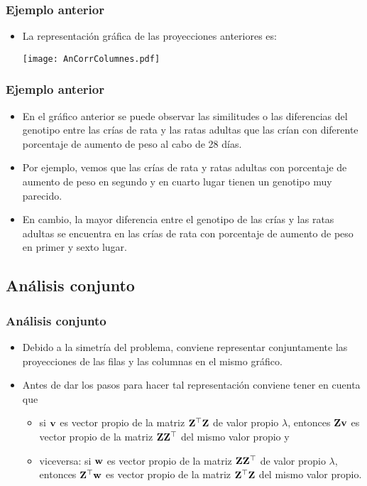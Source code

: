 \begin{frame}
\frametitle{Ejemplo anterior}
\begin{itemize}
\item<2->{La representación gráfica de las proyecciones anteriores es:
\begin{center}
\texttt{[image: AnCorrColumnes.pdf]}
\end{center}}
\end{itemize}
\end{frame}
\begin{frame}
\frametitle{Ejemplo anterior}
\begin{itemize}
\item<2->{En el gráfico anterior se puede observar las similitudes o las diferencias del genotipo entre las crías de rata y las ratas adultas que las crían con diferente porcentaje de aumento de peso al cabo de 28 días. }
\item<3->{Por ejemplo, vemos que las crías de rata y ratas adultas con porcentaje de aumento de peso en segundo y en cuarto lugar tienen un genotipo muy parecido.}
\item<4->{En cambio, la mayor diferencia entre el genotipo de las crías y las ratas adultas se encuentra en las crías de rata con porcentaje de aumento de peso en primer y sexto lugar.}
\end{itemize}
\end{frame}
\subsection{Análisis conjunto}
\begin{frame}
\frametitle{Análisis conjunto}
\begin{itemize}
\item<2->{Debido a la simetría del problema, conviene representar conjuntamente las proyecciones de las filas y las columnas en el mismo gráfico.}
\item<3->{Antes de dar los pasos para hacer tal representación conviene tener en cuenta que
\begin{itemize}
\item<4->{si $\mathbf{v}$ es vector propio de la matriz $\mathbf{Z}^\top\mathbf{Z}$ de valor propio $\lambda$, entonces $\mathbf{Z}\mathbf{v}$ es vector propio de la matriz $\mathbf{Z}\mathbf{Z}^\top$ del mismo valor propio y} \item<5->{viceversa: si $\mathbf{w}$ es vector propio de la matriz $\mathbf{Z}\mathbf{Z}^\top$ de valor propio $\lambda$, entonces $\mathbf{Z}^\top\mathbf{w}$ es vector propio de la matriz $\mathbf{Z}^\top\mathbf{Z}$ del mismo valor propio.}
\end{itemize}}
\end{itemize}
\end{frame}

